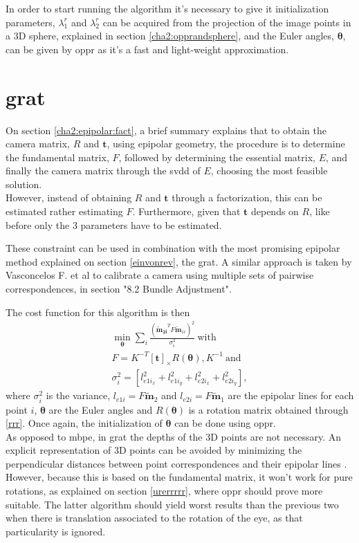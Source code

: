 In order to start running the algorithm it's necessary to give it initialization parameters, $\lambda_{1}^r$ and $\lambda_{2}^r$ can be acquired from the projection of the image points in a 3D sphere, explained in section \ref{cha2:opprandsphere}, and the Euler angles, $\mathbf{\theta}$, can be given by \acrlong{oppr} as it's a fast and light-weight approximation.

\section{\acrlong{grat}}
On section \ref{cha2:epipolar:fact}, a brief summary explains that to obtain the camera matrix, $R$ and $\mathbf{t}$, using epipolar geometry, the procedure is to determine the fundamental matrix, $F$, followed by determining the essential matrix, $E$, and finally the camera matrix through the \acrshort{svdd} of $E$, choosing the most feasible solution.\\
However, instead of obtaining $R$ and $\mathbf{t}$ through a factorization, this can be estimated rather estimating $F$. Furthermore, given that $\mathbf{t}$ depends on $R$, like before only the 3 parameters have to be estimated. 

These constraint can be used in combination with the most promising epipolar method explained on section \ref{einvonrev}, the \acrlong{grat}. A similar approach is taken by Vasconcelos F. et al \cite{vasconcelos}
to calibrate a camera using multiple sets of pairwise correspondences, in section "8.2 Bundle Adjustment". 

The cost function for this algorithm is then
\begin{align}
\min_\mathbf{\theta} \sum_i \frac{ (\mathbf{\widetilde{\mathbf{m}}_{2i}}^T F \widetilde{\mathbf{m}}_{1i})^2}{\sigma_i^2} \ \text{with}\\
F = K^{-T} [\mathbf{t}]_\times R(\mathbf{ \theta}), K^{-1} \ \text{and}\\
\sigma_i^2 =  [l_{{e1i}_x}^2 + l_{{e1i}_y}^2 + l_{{e2i}_x}^2 + l_{{e2i}_y}^2],
\end{align}
where $\sigma_i^2$ is the variance, $l_{e1i} = F\widetilde{\mathbf{m}}_{2}$ and $l_{e2i} = F\widetilde{\mathbf{m}}_{1}$ are the epipolar lines for each point $i$, $\mathbf{\theta}$ are the Euler angles and $R(\mathbf{ \theta})$ is a rotation matrix obtained through \ref{rrr}. Once again, the initialization of $\mathbf{ \theta}$ can be done using \acrlong{oppr}.\\

As opposed to \acrshort{mbpe}, in \acrshort{grat} the depths of the 3D points are not necessary. An explicit representation of 3D points can be avoided by minimizing the perpendicular distances between point correspondences and their epipolar lines \cite{vasconcelos} \cite{bundle}.
However, because this is based on the fundamental matrix, it won't work for pure rotations, as explained on section \ref{urerrrrr}, where \acrshort{oppr} should prove more suitable. The latter algorithm should yield worst results than the previous two when there is translation associated to the rotation of the eye, as that particularity is ignored.

